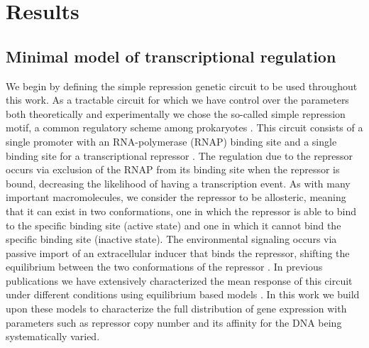 \section{Results}

\subsection{Minimal model of transcriptional regulation}\label{sec_model}

We begin by defining the simple repression genetic circuit to be used
throughout this work. As a tractable circuit for which we have control over the
parameters both theoretically and experimentally we chose the so-called simple
repression motif, a common regulatory scheme among prokaryotes
\cite{Rydenfelt2014}. This circuit consists of a single promoter with an
RNA-polymerase (RNAP) binding site and a single binding site for a
transcriptional repressor \cite{Garcia2011c}. The regulation due to the
repressor occurs via exclusion of the RNAP from its binding site when the
repressor is bound, decreasing the likelihood of having a transcription event.
As with many important macromolecules, we consider the repressor to be
allosteric, meaning that it can exist in two conformations, one in which the
repressor is able to bind to the specific binding site (active state) and one
in which it cannot bind the specific binding site (inactive state). The
environmental signaling occurs via passive import of an extracellular inducer
that binds the repressor, shifting the equilibrium between the two
conformations of the repressor \cite{Razo-Mejia2018}. In previous publications
we have extensively characterized the mean response of this circuit under
different conditions using equilibrium based models \cite{Phillips2019}. In
this work we build upon these models to characterize the full distribution of
gene expression with parameters such as repressor copy number and its affinity
for the DNA being systematically varied.

